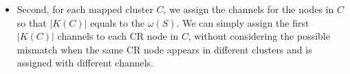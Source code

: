 \documentclass[10pt,journal,compsoc]{IEEEtran}
\makeatletter
\theoremstyle{mytheoremstyle}
\theoremstyle{mytheoremstyle}
\theoremstyle{mytheoremstyle}
\renewenvironment{proof}[1][\proofname]{%
      \par\pushQED{\qed}\fontfamily{ptm}\selectfont%
      \topsep6\p@\@plus6\p@\relax
      \trivlist\item[\hskip\labelsep\bfseries#1\@addpunct{.}]%
      \ignorespaces
    }{%
      \popQED\endtrivlist\@endpefalse
    }
\newcommand{\ie}{i.e., }
\makeatother
\begin{document}
\begin{proof}
\begin{itemize}
\item Second, for each mapped cluster $C$, we assign the channels for the nodes in $C$ so that $|K(C)|$ equals to the $\omega(S)$.
We can simply assign the first $|K(C)|$ channels to each CR node in $C$, without considering the possible mismatch when the same CR node appears in different clusters and is assigned with different channels.
%






\end{itemize}
\end{proof}
\end{document}
